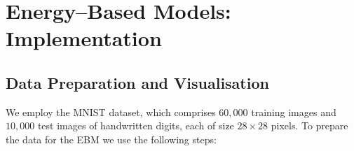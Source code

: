 

\section{Energy--Based Models: Implementation}

\subsection{Data Preparation and Visualisation}

We employ the MNIST dataset, which comprises $60{,}000$ training images and
$10{,}000$ test images of handwritten digits, each of size $28\times 28$
pixels.  To prepare the data for the EBM we use the following steps:

